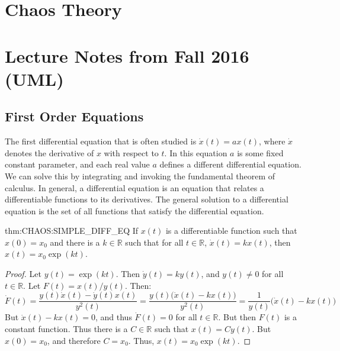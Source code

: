 \documentclass[crop=false,class=article,oneside]{standalone}
\begin{document}
    \ifx\ifmathcourseschaostheory\undefined
        \section*{Chaos Theory}
        \setcounter{section}{1}
        \renewcommand\thefigure{\arabic{section}.\arabic{figure}}
        \renewcommand\thesubfigure{%
            \arabic{section}.\arabic{figure}.\arabic{subfigure}}
    \else
        \section{Lecture Notes from Fall 2016 (UML)}
    \fi
    \subsection{First Order Equations}
        The first differential equation that is often studied
        is $\dot{x}(t)=ax(t)$, where $\dot{x}$ denotes the
        derivative of $x$ with respect to $t$. In this equation
        $a$ is some fixed constant parameter, and each real
        value $a$ defines a different differential equation.
        We can solve this by integrating and invoking the
        fundamental theorem of calculus. In general, a
        differential equation is an equation that relates
        a differentiable functions to its derivatives.
        The general solution to a differential equation is
        the set of all functions that satisfy the
        differential equation.
        \begin{frametheorem}{}{thm:CHAOS:SIMPLE_DIFF_EQ}
            If $x(t)$ is a differentiable function such
            that $x(0)=x_{0}$ and there is a $k\in\mathbb{R}$
            such that for all $t\in\mathbb{R}$, $\dot{x}(t)=kx(t)$,
            then $x(t)=x_{0}\exp(kt)$.
        \end{frametheorem}
        \begin{proof}
            Let $y(t)=\exp(kt)$. Then $\dot{y}(t)=ky(t)$,
            and $y(t)\ne{0}$ for all $t\in\mathbb{R}$.
            Let $F(t)=x(t)/y(t)$. Then:
            \begin{equation*}
                \dot{F}(t)=
                \frac{y(t)\dot{x}(t)-\dot{y}(t)x(t)}{y^{2}(t)}
                =\frac{y(t)\big(\dot{x}(t)-kx(t)\big)}{y^{2}(t)}
                =\frac{1}{y(t)}\big(\dot{x}(t)-kx(t)\big)
            \end{equation*}
            But $\dot{x}(t)-kx(t)=0$, and thus $\dot{F}(t)=0$ for
            all $t\in\mathbb{R}$. But then $F(t)$ is a constant
            function. Thus there is a $C\in\mathbb{R}$ such
            that $x(t)=Cy(t)$. But $x(0)=x_{0}$, and therefore
            $C=x_{0}$. Thus, $x(t)=x_{0}\exp(kt)$.
        \end{proof}
\end{document}
